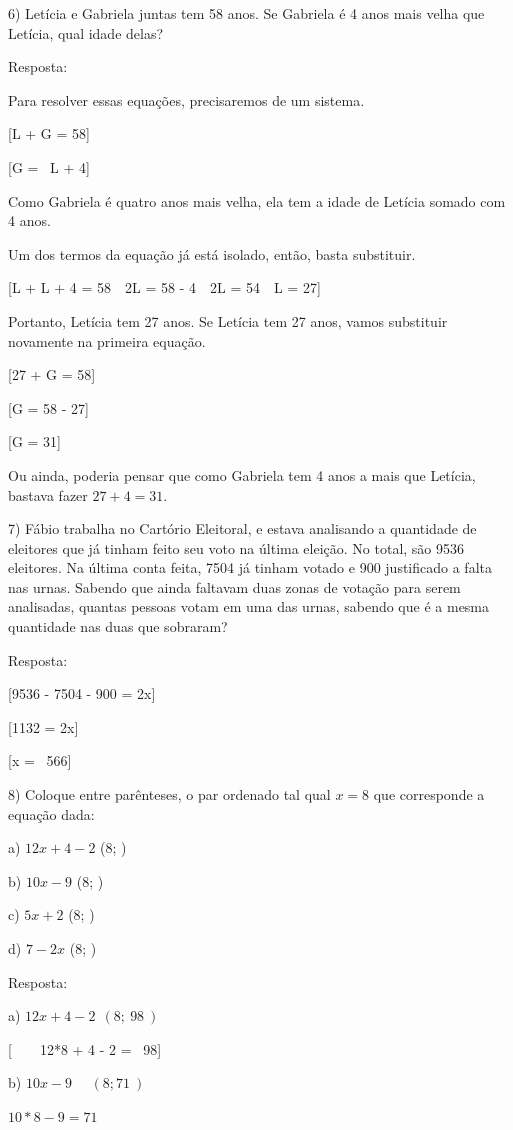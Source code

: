 6) Letícia e Gabriela juntas tem 58 anos. Se Gabriela é 4 anos mais
velha que Letícia, qual idade delas?

Resposta:

Para resolver essas equações, precisaremos de um sistema.

[L + G = 58]

[G = \ L + 4]

Como Gabriela é quatro anos mais velha, ela tem a idade de Letícia
somado com 4 anos.

Um dos termos da equação já está isolado, então, basta substituir.

[L + L + 4 = 58\  \Rightarrow \ 2L = 58 - 4\  \Rightarrow \ 2L = 54\  \Rightarrow \ L = 27]

Portanto, Letícia tem 27 anos. Se Letícia tem 27 anos, vamos substituir
novamente na primeira equação.

[27 + G = 58]

[G = 58 - 27]

[G = 31]

Ou ainda, poderia pensar que como Gabriela tem 4 anos a mais que
Letícia, bastava fazer \(27 + 4 = 31.\)

7) Fábio trabalha no Cartório Eleitoral, e estava analisando a
quantidade de eleitores que já tinham feito seu voto na última eleição.
No total, são 9536 eleitores. Na última conta feita, 7504 já tinham
votado e 900 justificado a falta nas urnas. Sabendo que ainda faltavam
duas zonas de votação para serem analisadas, quantas pessoas votam em
uma das urnas, sabendo que é a mesma quantidade nas duas que sobraram?

Resposta:

[9536 - 7504 - 900 = 2x]

[1132 = 2x]

[x = \ 566]

8) Coloque entre parênteses, o par ordenado tal qual \(x = 8\) que
corresponde a equação dada:

a) \(12x + 4 - 2\) (8; )

b) \(10x - 9\) (8; )

c) \(5x + 2\) (8; )

d) \(7 - 2x\) (8; )

Resposta:

a) \(12x + 4 - 2\ \ (8;\ 98\ )\)

[\ \ \ \ 12*8 + 4 - 2 = \ 98]

b) \(10x - 9\ \ \ \ \ \ (8;71\ )\)

\(10*8 - 9 = 71\)

